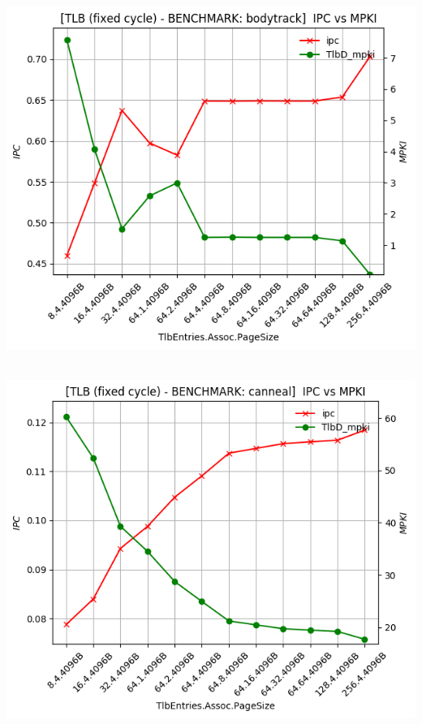 \begin{minipage}{\textwidth}
    \begin{center}
        \\
        \vspace{3mm}
        \includegraphics[scale=0.70]{graphs/TLB/fixed/bodytrack.png}
        \vspace{6mm}
    \end{center}
\end{minipage}

\begin{minipage}{\textwidth}
    \begin{center}
        \\
        \vspace{3mm}
        \includegraphics[scale=0.70]{graphs/TLB/fixed/canneal.png}
        \vspace{6mm}
    \end{center}
\end{minipage}

